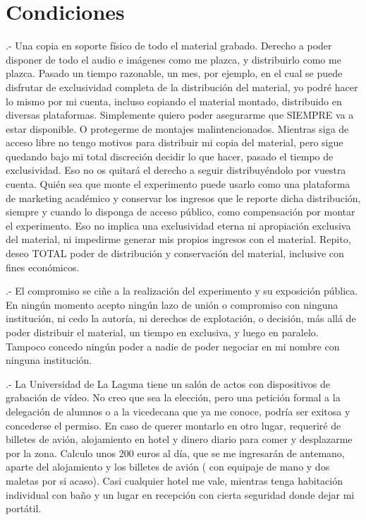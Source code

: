\chapter{Condiciones}

.- Una copia en soporte físico de todo el material grabado. Derecho a poder disponer de todo el audio e imágenes como me plazca, y distribuirlo como me plazca. Pasado un tiempo razonable, un mes, por ejemplo, en el cual se puede disfrutar de exclusividad completa de la distribución del material, yo podré hacer lo mismo por mi cuenta, incluso copiando el material montado, distribuido en diversas plataformas. Simplemente quiero poder asegurarme que SIEMPRE va a estar disponible. O protegerme de montajes malintencionados. Mientras siga de acceso libre no tengo motivos para distribuir mi copia del material, pero sigue quedando bajo mi total discreción decidir lo que hacer, pasado el tiempo de exclusividad. Eso no os quitará el derecho a seguir distribuyéndolo por vuestra cuenta. Quién sea que monte el experimento puede usarlo como una plataforma de marketing académico y conservar los ingresos que le reporte dicha distribución, siempre y cuando lo disponga de acceso público, como compensación por montar el experimento. Eso no implica una exclusividad eterna ni apropiación exclusiva del material, ni impedirme generar mis propios ingresos con el material. Repito, deseo TOTAL poder de distribución y conservación del material, inclusive con fines económicos.

.- El compromiso se ciñe a la realización del experimento y su exposición pública. En ningún momento acepto ningún lazo de unión o compromiso con ninguna institución, ni cedo la autoría, ni derechos de explotación, o decisión, más allá de poder distribuir el material, un tiempo en exclusiva, y luego en paralelo. Tampoco concedo ningún poder a nadie de poder negociar en mi nombre con ninguna institución.

.- La Universidad de La Laguna tiene un salón de actos con dispositivos de grabación de vídeo. No creo que sea la elección, pero una petición formal a la delegación de alumnos o a la vicedecana que ya me conoce, podría ser exitosa y concederse el permiso. En caso de querer montarlo en otro lugar, requeriré de billetes de avión, alojamiento en hotel y dinero diario para comer y desplazarme por la zona. Calculo unos 200 euros al día, que se me ingresarán de antemano, aparte del alojamiento y los billetes de avión ( con equipaje de mano y dos maletas por si acaso). Casi cualquier hotel me vale, mientras tenga habitación individual con baño y un lugar en recepción con cierta seguridad donde dejar mi portátil.

